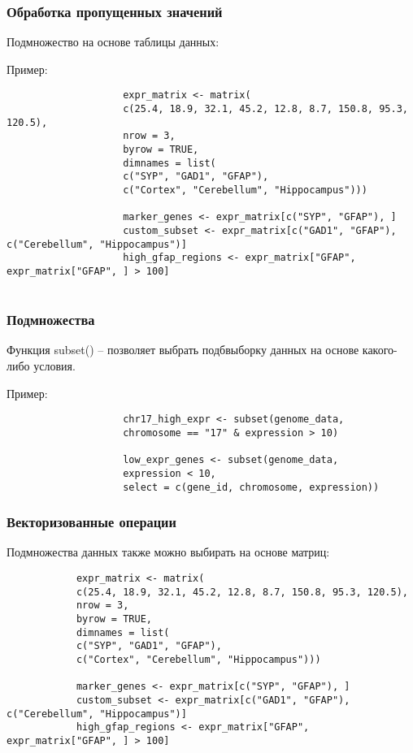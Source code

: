 \documentclass[10pt]{beamer}
\begin{document}
	
	\begin{frame}[fragile]
		\frametitle{Обработка пропущенных значений}
		Подмножество на основе таблицы данных:
		{\fontsize{8}{9}\selectfont
			\begin{exampleblock}{Пример:}
				\begin{verbatim}
					expr_matrix <- matrix(
					c(25.4, 18.9, 32.1, 45.2, 12.8, 8.7, 150.8, 95.3, 120.5), 
					nrow = 3,
					byrow = TRUE,
					dimnames = list(
					c("SYP", "GAD1", "GFAP"), 
					c("Cortex", "Cerebellum", "Hippocampus")))
					
					marker_genes <- expr_matrix[c("SYP", "GFAP"), ]
					custom_subset <- expr_matrix[c("GAD1", "GFAP"), c("Cerebellum", "Hippocampus")]
					high_gfap_regions <- expr_matrix["GFAP", expr_matrix["GFAP", ] > 100]          
					
				\end{verbatim}
			\end{exampleblock}
		}
		
		
	\end{frame}
	
	\begin{frame}[fragile]
		\frametitle{Подмножества}
		Функция subset() – позволяет выбрать подбвыборку данных на основе какого-либо условия.
		{\fontsize{8}{9}\selectfont
			\begin{exampleblock}{Пример:}
				\begin{verbatim}
					chr17_high_expr <- subset(genome_data, 
					chromosome == "17" & expression > 10)
					
					low_expr_genes <- subset(genome_data, 
					expression < 10, 
					select = c(gene_id, chromosome, expression))\end{verbatim}
			\end{exampleblock}
		}
		
		
	\end{frame}
	
	
	\begin{frame}[fragile]
		\frametitle{Векторизованные операции}
		Подмножества данных также можно выбирать на основе матриц:
		\begin{verbatim}
			expr_matrix <- matrix(
			c(25.4, 18.9, 32.1, 45.2, 12.8, 8.7, 150.8, 95.3, 120.5), 
			nrow = 3,
			byrow = TRUE,
			dimnames = list(
			c("SYP", "GAD1", "GFAP"), 
			c("Cortex", "Cerebellum", "Hippocampus")))
			
			marker_genes <- expr_matrix[c("SYP", "GFAP"), ]
			custom_subset <- expr_matrix[c("GAD1", "GFAP"), c("Cerebellum", "Hippocampus")]
			high_gfap_regions <- expr_matrix["GFAP", expr_matrix["GFAP", ] > 100]          
			
		\end{verbatim}
	\end{frame}
	
\end{document}
